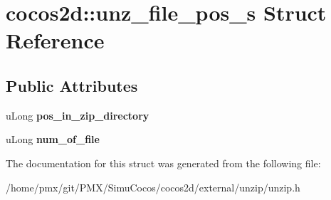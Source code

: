 \hypertarget{structcocos2d_1_1unz__file__pos__s}{}\section{cocos2d\+:\+:unz\+\_\+file\+\_\+pos\+\_\+s Struct Reference}
\label{structcocos2d_1_1unz__file__pos__s}
\subsection*{Public Attributes}
\begin{DoxyCompactItemize}
\item 
\mbox{\label{structcocos2d_1_1unz__file__pos__s_af1fbd8c1973581bed909db4bec441528}} 
u\+Long {\bfseries pos\+\_\+in\+\_\+zip\+\_\+directory}
\item 
\mbox{\label{structcocos2d_1_1unz__file__pos__s_ab261ac522da6f6bc7c7bb7657051cace}} 
u\+Long {\bfseries num\+\_\+of\+\_\+file}
\end{DoxyCompactItemize}


The documentation for this struct was generated from the following file\+:\begin{DoxyCompactItemize}
\item 
/home/pmx/git/\+P\+M\+X/\+Simu\+Cocos/cocos2d/external/unzip/unzip.\+h\end{DoxyCompactItemize}
